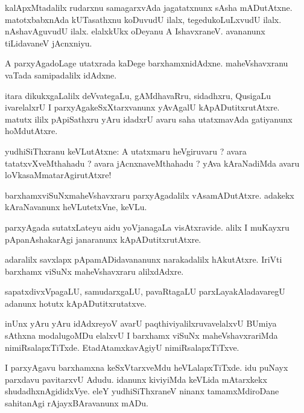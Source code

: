 \documentclass{article}
\begin{document}
\begin{mn}
kalApxMtadalilx rudarxnu samagarxvAda jagatatxnunx sAsha mADutAtxne. matotxbabxnAda kUTasathxnu 
koDuvudU ilalx, tegedukoLuLxvudU ilalx. nAshavAguvudU ilalx. elalxkUkx oDeyanu A IshavxraneV. 
avananunx tiLidavaneV jAcnxniyu.
\end{mn}

\begin{mn}
A parxyAgadoLage utatxrada kaDege barxhamxnidAdxne. maheVshavxranu vaTada samipadalilx idAdxne.
\end{mn}

\begin{mn}
itara dikukxgaLalilx deVvategaLu, gAMdhavaRru, sidadhxru, QusigaLu ivarelalxrU I 
parxyAgakeSxXtarxvanunx yAvAgalU kApADutitxrutAtxre. matutx ililx pApiSathxru yAru idadxrU avaru 
saha utatxmavAda gatiyanunx hoMdutAtxre.
\end{mn}

\begin{mn}
yudhiSiThxranu keVLutAtxne: A utatxmaru heVgiruvaru ? avara tatatxvXveMthahadu ? avara 
jAcnxnaveMthahadu ? yAva kAraNadiMda avaru loVkasaMmatarAgirutAtxre!
\end{mn}

\begin{mn}
barxhamxviSuNxmaheVshavxraru parxyAgadalilx vAsamADutAtxre. adakekx kAraNavanunx heVLutetxVne, 
keVLu.
\end{mn}

\begin{mn}
parxyAgada sutatxLateyu aidu yoVjanagaLa visAtxravide. alilx I muKayxru pApanAshakarAgi 
janaranunx kApADutitxrutAtxre.
\end{mn}

\begin{mn}
adaralilx savxlapx pApamADidavananunx narakadalilx hAkutAtxre. IriVti barxhamx viSuNx 
maheVshavxraru alilxdAdxre.
\end{mn}

\begin{mn}
sapatxdivxVpagaLU, samudarxgaLU, pavaRtagaLU parxLayakAladavaregU adanunx hotutx kApADutitxrutatxve.
\end{mn}

\begin{mn}
inUnx yAru yAru idAdxreyoV avarU paqthiviyalilxruvavelalxvU BUmiya sAthxna modalugoMDu elalxvU  I
barxhamx viSuNx maheVshavxrariMda nimiRsalapxTiTxde. EtadAtamxkavAgiyU nimiRsalapxTiTxve.
\end{mn}

\begin{mn}
I parxyAgavu barxhamxna keSxVtarxveMdu heVLalapxTiTxde. idu puNayx parxdavu pavitarxvU Adudu. 
idanunx kiviyiMda keVLida mAtarxkekx shudadhxnAgididxVye. eleY yudhiSiThxraneV ninanx 
tamamxMdiroDane sahitanAgi rAjayxBAravanunx mADu.
\end{mn}
\end{document}
